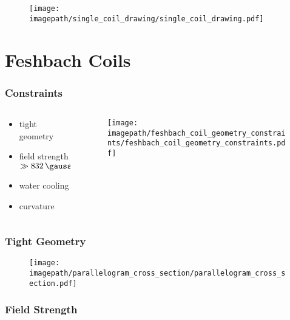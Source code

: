 \renewcommand{\imagepath}{\textpath/40-coils/img}

\begin{frame}
    \begin{figure}
        \raggedleft
        \texttt{[image: \\imagepath/single\_coil\_drawing/single\_coil\_drawing.pdf]}
    \end{figure}
    \section{Feshbach Coils}
\end{frame}

\begin{frame}
    \frametitle{Constraints}

    \begin{columns}
        \begin{column}{0.4\textwidth}
            \begin{itemize}
                \item tight geometry
                \item field strength $\gg \SI[]{832}{\gauss}$
                \item water cooling
                \item curvature
            \end{itemize}
        \end{column}

        \begin{column}{0.55\textwidth}
            \begin{figure}
                \texttt{[image: \\imagepath/feshbach\_coil\_geometry\_constraints/feshbach\_coil\_geometry\_constraints.pdf]}
            \end{figure}
        \end{column}
    \end{columns}
\end{frame}

\begin{frame}
    \frametitle{Tight Geometry}
    \begin{figure}
        \texttt{[image: \\imagepath/parallelogram\_cross\_section/parallelogram\_cross\_section.pdf]}
    \end{figure}
\end{frame}

\begin{frame}
    \frametitle{Field Strength}
\end{frame}

